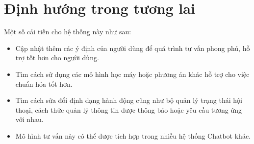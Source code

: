 \section{Định hướng trong tương lai}
Một số cải tiến cho hệ thống này như sau:

\begin{itemize}
    \item Cập nhật thêm các ý định của người dùng để quá trình tư vấn
    phong phú, hỗ trợ tốt hơn cho người dùng.
    \item Tìm cách sử dụng các mô hình học máy hoặc phương án khác
    hỗ trợ cho việc chuẩn hóa tốt hơn.
    \item Tìm cách sửa đổi định dạng hành động cũng như bộ quản lý
    trạng thái hội thoại, cách thức quản lý thông tin được thông báo
    hoặc yêu cầu tương ứng với nhau.
    \item Mô hình tư vấn này có thể được tích hợp trong nhiều hệ thống
    Chatbot khác.
\end{itemize}
